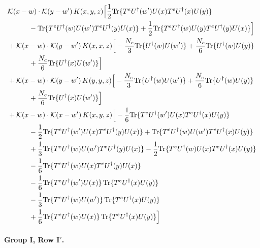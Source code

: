 \documentclass[10pt]{article}
\numberwithin{equation}{section}
\begin{document}
\begin{align}
&\mathcal K(x-w)\cdot\mathcal K(y-w')\,K(x,y,z)\Big[\frac{1}{2}{\rm Tr}\{T^eU^\dagger(w')U(x)T^eU^\dagger(x)U(y)\}\notag\\
&\quad\quad\quad-{\rm Tr}\{T^eU^\dagger(w)U(w')T^eU^\dagger(y)U(x)\}+\frac{1}{2}{\rm Tr}\{T^eU^\dagger(w)U(y)T^eU^\dagger(y)U(x)\}\Big]\notag\\
&+\mathcal K(x-w)\cdot\mathcal K(y-w')\,K(x,x,z)\Big[-\frac{N_c}{3}{\rm Tr}\{U^\dagger(w)U(w')\}+\frac{N_c}{6}{\rm Tr}\{U^\dagger(w)U(y)\}\notag\\
&\quad\quad\quad+\frac{N_c}{6}{\rm Tr}\{U^\dagger(x)U(w')\}\Big]\notag\\
&+\mathcal K(x-w)\cdot\mathcal K(y-w')\,K(y,y,z)\Big[-\frac{N_c}{3}{\rm Tr}\{U^\dagger(w)U(w')\}+\frac{N_c}{6}{\rm Tr}\{U^\dagger(w)U(y)\}\notag\\
&\quad\quad\quad+\frac{N_c}{6}{\rm Tr}\{U^\dagger(x)U(w')\}\Big]\notag\\
&+\mathcal K(x-w)\cdot\mathcal K(x-w')\,K(x,y,z)\Big[-\frac{1}{6}{\rm Tr}\{T^eU^\dagger(w')U(x)T^eU^\dagger(x)U(y)\}\notag\\
&\quad\quad\quad-\frac{1}{2}{\rm Tr}\{T^eU^\dagger(w')U(x)T^eU^\dagger(y)U(x)\}+{\rm Tr}\{T^eU^\dagger(w)U(w')T^eU^\dagger(x)U(y)\}\notag\\
&\quad\quad\quad+\frac{1}{3}{\rm Tr}\{T^eU^\dagger(w)U(w')T^eU^\dagger(y)U(x)\}-\frac{1}{2}{\rm Tr}\{T^eU^\dagger(w)U(x)T^eU^\dagger(x)U(y)\}\notag\\
&\quad\quad\quad-\frac{1}{6}{\rm Tr}\{T^eU^\dagger(w)U(x)T^eU^\dagger(y)U(x)\}\notag\\
&\quad\quad\quad-\frac{1}{6}{\rm Tr}\{T^eU^\dagger(w')U(x)\}\,{\rm Tr}\{T^eU^\dagger(x)U(y)\}\notag\\
&\quad\quad\quad-\frac{1}{3}{\rm Tr}\{T^eU^\dagger(w)U(w')\}\,{\rm Tr}\{T^eU^\dagger(x)U(y)\}\notag\\
&\quad\quad\quad+\frac{1}{6}{\rm Tr}\{T^eU^\dagger(w)U(x)\}\,{\rm Tr}\{T^eU^\dagger(x)U(y)\}\Big]
\label{eq:G1Ib}
\end{align}

\paragraph{Group I, Row I$'$.}
\end{document}
